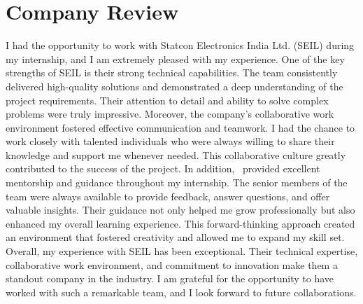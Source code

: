 \section{Company Review}
I had the opportunity to work with Statcon Electronics India Ltd. (SEIL) during my internship, and I am extremely pleased with my experience. 
One of the key strengths of SEIL is their strong technical capabilities. The team consistently delivered high-quality solutions and demonstrated a deep understanding of the project requirements. Their attention to detail and ability to solve complex problems were truly impressive.
Moreover, the company's collaborative work environment fostered effective communication and teamwork. I had the chance to work closely with talented individuals who were always willing to share their knowledge and support me whenever needed. This collaborative culture greatly contributed to the success of the project.
In addition, \industry \ provided excellent mentorship and guidance throughout my internship. The senior members of the team were always available to provide feedback, answer questions, and offer valuable insights. Their guidance not only helped me grow professionally but also enhanced my overall learning experience.
This forward-thinking approach created an environment that fostered creativity and allowed me to expand my skill set.
Overall, my experience with SEIL has been exceptional. Their technical expertise, collaborative work environment, and commitment to innovation make them a standout company in the industry. I am grateful for the opportunity to have worked with such a remarkable team, and I look forward to future collaborations.

